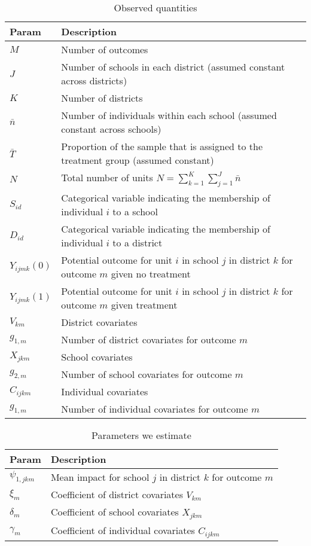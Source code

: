 \documentclass[12pt]{article}
\begin{document}
\begin{table}[p]
\begin{tabular}{p{1.5cm} | p{16cm}}
Param											& Description \\ \hline
$M$												& Number of outcomes \\
$J$												& Number of schools in each district (assumed constant across districts) \\
$K$												& Number of districts \\
$\bar{n}$										& Number of individuals within each school (assumed constant across schools) \\
$\bar{T}$										& Proportion of the sample that is assigned to the treatment group (assumed constant) \\
$N$												& Total number of units $N =\sum_{k=1}^{K} \sum_{j=1}^{J}  \bar{n}$ \\ \hline
$S_{id}$										& Categorical variable indicating the membership of individual $i$ to a school\\
$D_{id}$										& Categorical variable indicating the membership of individual $i$ to a district\\ \hline
$Y_{ijmk}(0)$									& Potential outcome for unit $i$ in school $j$ in district $k$ for outcome $m$ given no treatment\\
$Y_{ijmk}(1)$									& Potential outcome for unit $i$ in school $j$ in district $k$ for outcome $m$ given treatment\\ \hline
$V_{km}$										& District covariates \\
$g_{1,m}$										& Number of district covariates for outcome $m$\\
$X_{jkm}$										& School covariates \\
$g_{2,m}$										& Number of school covariates for outcome $m$\\
$C_{ijkm}$										& Individual covariates \\
$g_{1,m}$										& Number of individual covariates for outcome $m$\\
\end{tabular}
\caption{Observed quantities\label{tab:observed_param}}
\end{table}


\begin{table}[p]
\begin{tabular}{p{1.5cm} | p{16cm}}
Param											& Description \\ \hline
$\psi_{1,jkm}$									& Mean impact for school $j$ in district $k$ for outcome $m$\\ \hline
$\xi_m$											& Coefficient of district covariates $V_{km}$ \\
$\delta_{m}$									& Coefficient of school covariates $X_{jkm}$ \\
$\gamma_{m}$									& Coefficient of individual covariates $C_{ijkm}$ \\
\end{tabular}
\caption{Parameters we estimate\label{tab:estimate_param}}
\end{table}
\end{document}

